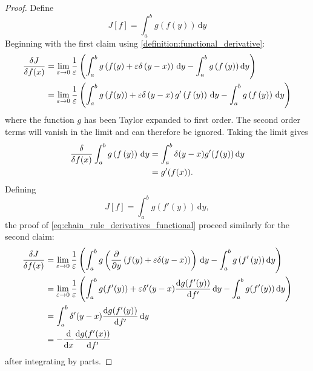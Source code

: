 \begin{proof}
  Define
  \begin{equation*}
    J[f] = \int_a^b g\left(f\left(y\right)\right)\,\mathrm{d}y
  \end{equation*}
  Beginning with the first claim using \cref{definition:functional_derivative}:
  \begin{align*}
    \fdv{J}{f(x)}  &= \lim_{\epsilon\rightarrow 0} \frac{1}{\epsilon} \left(\int_a^b g\left(f(y) + \epsilon \delta\left(y-x\right)\right)\,\mathrm{d}y
                                                                     - \int_a^b g\left(f\left(y\right)\right)\mathrm{d}y \right)\\
    &=  \lim_{\epsilon\rightarrow 0} \frac{1}{\epsilon} \left(\int_a^b g\left(f(y)\right) + \epsilon \delta\left(y-x\right)g'\left(f\left(y\right)\right)\,\mathrm{d}y
                                                                     - \int_a^b g\left(f\left(y\right)\right)\,\mathrm{d}y\right)
  \end{align*}
  where the function $g$ has been Taylor expanded to first order. The second order terms will vanish in the limit and can therefore be ignored.
  Taking the limit gives
  \begin{align*}
    \fdv{f(x)} \int_a^b g\left(f\left(y\right)\right)\,\mathrm{d}y &= \int_a^b \delta(y - x) g'(f(y))\,\mathrm{d}y \\
                                                                   &= g'(f(x)).                                                              
  \end{align*}
  Defining
  \begin{equation*}
    J[f] =  \int_a^b g\left(f'\left(y\right)\right)\,\mathrm{d}y,
  \end{equation*}
  the proof of \cref{eq:chain_rule_derivatives_functional} proceed similarly for the second claim:
  \begin{align*}
    \fdv{J}{f(x)}  &= \lim_{\epsilon\rightarrow 0} \frac{1}{\epsilon}\left(\int_a^b g\left(\pdv{y}\left(f(y) + \epsilon \delta (y-x)\right)\right)\, \mathrm{d}y- \int_a^b g \left( f' \left( y \right) \right)\mathrm{d}y\right)       \\
                                                                    &= \lim_{\epsilon\rightarrow 0} \frac{1}{\epsilon}\left(\int_a^b g(f'(y)) + \epsilon \delta' (y-x)\dv{g(f'(y))}{f'}\, \mathrm{d}y- \int_a^b g(f'(y))\,\mathrm{d}y\right) \\
                                                                    &= \int_a^b \delta' (y-x)\dv{g(f'(y))}{f'}\, \mathrm{d}y \\
    &= - \dv{x} \dv{g(f'(x))}{f'}
  \end{align*}
  after integrating by parts.
\end{proof}

